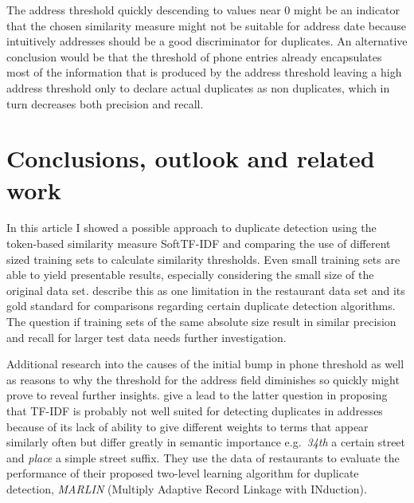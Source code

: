 \documentclass[conference]{IEEEtran}
\begin{document}
The address threshold quickly descending to values near 0 might be an indicator that the chosen similarity measure might not be suitable for address date because intuitively addresses should be a good discriminator for duplicates. An alternative conclusion would be that the threshold of phone entries already encapsulates most of the information that is produced by the address threshold leaving a high address threshold only to declare actual duplicates as non duplicates, which in turn decreases both precision and recall.


\section{Conclusions, outlook and related work}\label{conclusions}
In this article I showed a possible approach to duplicate detection using the token-based similarity measure SoftTF-IDF and comparing the use of different sized training sets to calculate similarity thresholds. Even small training sets are able to yield presentable results, especially considering the small size of the original data set. \textcite{Vogel.2014} describe this as one limitation in the restaurant data set and its gold standard for comparisons regarding certain duplicate detection algorithms. The question if training sets of the same absolute size result in similar precision and recall for larger test data needs further investigation.

Additional research into the causes of the initial bump in phone threshold as well as reasons to why the threshold for the address field diminishes so quickly might prove to reveal further insights. \textcite{Bilenko.2003b} give a lead to the latter question in proposing that TF-IDF is probably not well suited for detecting duplicates in addresses because of its lack of ability to give different weights to terms that appear similarly often but differ greatly in semantic importance e.g.\ \emph{34th} a certain street and \emph{place} a simple street suffix. They use the data of restaurants to evaluate the performance of their proposed two-level learning algorithm for duplicate detection, \emph{MARLIN} (Multiply Adaptive Record Linkage with INduction).






\printbibliography

\appendices
\end{document}
